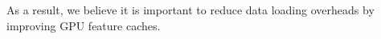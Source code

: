 As a result, we believe it is important to reduce data loading overheads by improving GPU feature caches.




